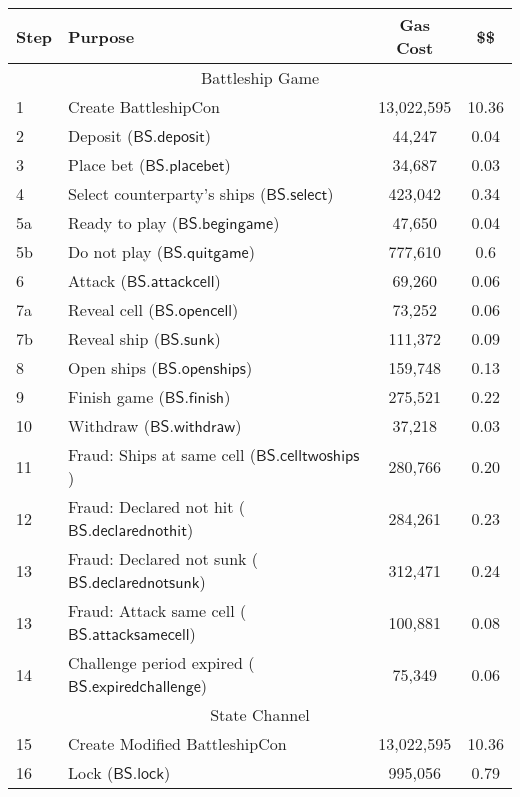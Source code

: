 \documentclass{llncs}
\newcommand{\battleshipattackcell}{\mathsf{BS.attackcell}}
\newcommand{\battleshipbegin}{\mathsf{BS.begingame}}
\newcommand{\battleshipquit}{\mathsf{BS.quitgame}}
\newcommand{\battleshipplacebet}{\mathsf{BS.placebet}}
\newcommand{\battleshipselectboard}{\mathsf{BS.select}}
\newcommand{\battleshiprevealcell}{\mathsf{BS.opencell}}
\newcommand{\battleshipsinking}{\mathsf{BS.sunk}}
\newcommand{\battleshiprevealboard}{\mathsf{BS.openships}}
\newcommand{\battleshipdeposit}{\mathsf{BS.deposit}}
\newcommand{\battleshipwithdraw}{\mathsf{BS.withdraw}}
\newcommand{\battleshipfinish}{\mathsf{BS.finish}}
\newcommand{\battleshipdeclarednotsunk}{\mathsf{BS.declarednotsunk}}
\newcommand{\battleshipdeclarednothit}{\mathsf{BS.declarednothit}}
\newcommand{\battleshipsamecell}{\mathsf{BS.attacksamecell}}
\newcommand{\battleshiptwoships}{\mathsf{BS.celltwoships}}
\newcommand{\battleshipchallengeexpired}{\mathsf{BS.expiredchallenge}}
\newcommand{\battleshiplock}{\mathsf{BS.lock}}
\begin{document}



\newpage 
\appendix


\begin{table}
	\centering
	\begin{tabular}[]{l l c c}
		
		\textbf{Step} & \textbf{Purpose} & \textbf{Gas Cost} & \textbf{\$\$}  \\ 
		\hline
		\multicolumn{4}{c}{Battleship Game} \\
		\hline
		1 & Create BattleshipCon & 13,022,595 & 10.36 \\
		2 & Deposit ($\battleshipdeposit$) & 44,247 & 0.04 \\
		3 & Place bet ($\battleshipplacebet$)& 34,687 & 0.03 \\
		4 & Select counterparty's ships ($\battleshipselectboard$) & 423,042 & 0.34 \\ 
		5a & Ready to play ($\battleshipbegin$) & 47,650 & 0.04 \\
		5b & Do not play ($\battleshipquit$) & 777,610 & 0.6 \\
		6 & Attack ($\battleshipattackcell$) & 69,260 & 0.06 \\
		7a & Reveal cell ($\battleshiprevealcell$) & 73,252 & 0.06 \\
		7b & Reveal ship ($\battleshipsinking$)& 111,372 & 0.09  \\
		8 & Open ships ($\battleshiprevealboard$) & 159,748 & 0.13 \\
		9 & Finish game ($\battleshipfinish$) & 275,521 & 0.22 \\
		10 & Withdraw ($\battleshipwithdraw$) & 37,218 &0.03 \\ 
		11 & Fraud: Ships at same cell ($\battleshiptwoships$) & 280,766 & 0.20\\
		12 & Fraud: Declared not hit ($\battleshipdeclarednothit$) & 284,261 & 0.23 \\
		13 & Fraud: Declared not sunk ($\battleshipdeclarednotsunk$) & 312,471 & 0.24 \\
		13 & Fraud: Attack same cell ($\battleshipsamecell$) & 100,881 & 0.08 \\
		14 & Challenge period expired ($\battleshipchallengeexpired$) &75,349 & 0.06 \\
		\hline
		\multicolumn{4}{c}{State Channel} \\
		\hline
		15 & Create Modified BattleshipCon & 13,022,595 & 10.36 \\
		16 & Lock ($\battleshiplock$) & 995,056 & 0.79 \\

\end{tabular}
\end{table}
\end{document}
